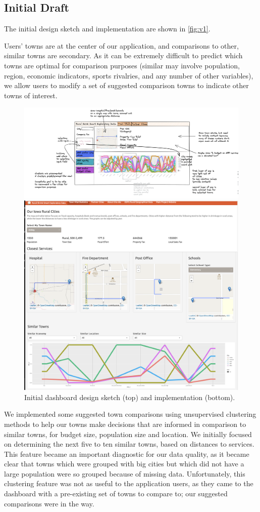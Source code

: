 \documentclass[print]{nuthesis}
\begin{document}
\subsection{Initial Draft}

The initial design sketch and implementation are shown in \autoref{fig:v1}.

Users' towns are at the center of our application, and comparisons to other, similar towns are secondary. As it can be extremely difficult to predict which towns are optimal for comparison purposes (similar may involve population, region, economic indicators, sports rivalries, and any number of other variables), we allow users to modify a set of suggested comparison towns to indicate other towns of interest.

\begin{figure}
\centering
\includegraphics[width=\textwidth]{figure/Version1.png}

\includegraphics[width=.7\textwidth]{figure/Version2.png}
\caption{Initial dashboard design sketch (top) and implementation (bottom).}\label{fig:v1}
\end{figure}

We implemented some suggested town comparisons using unsupervised clustering methods to help our towns make decisions that are informed in comparison to similar towns, for budget size, population size and location. We initially focused on determining the next five to ten similar towns, based on distances to services. This feature became an important diagnostic for our data quality, as it became clear that towns which were grouped with big cities but which did not have a large population were so grouped because of missing data. Unfortunately, this clustering feature was not as useful to the application users, as they came to the dashboard with a pre-existing set of towns to compare to; our suggested comparisons were in the way.
\end{document}
